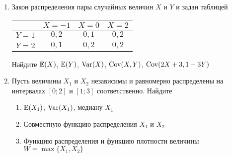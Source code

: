 \documentclass[pdftex,12pt,a4paper]{article}
\begin{document}
\begin{enumerate}
\item Закон распределения пары случайных величин $X$ и $Y$  и  задан таблицей


\begin{tabular}{c|ccc}
 & $X=-1$ & $X=0$ & $X=2$ \\ 
\hline 
$Y=1$ & $0{,}2$ & $0{,}1$ & $0{,}2$ \\ 
$Y=2$ & $0{,}1$ & $0{,}2$ & $0{,}2$ \\ 
\end{tabular} 


Найдите $\mathbb{E}(X)$, $\mathbb{E}(Y)$, $\operatorname{Var}(X)$, $\operatorname{Cov}(X,Y)$, $\operatorname{Cov}(2X+3,1-3Y)$

\item Пусть величины $X_1$ и $X_2$ независимы и равномерно распределены на интервалах $[0;2]$ и $[1;3]$ соответственно. Найдите
\begin{enumerate}
\item $\mathbb{E}(X_1)$, $\operatorname{Var}(X_1)$, медиану $X_1$
\item Совместную функцию распределения $X_1$ и $X_2$
\item Функцию распределения и функцию плотности величины $W=\max\{X_1,X_2\}$
\end{enumerate}
\end{enumerate}
\end{document}
